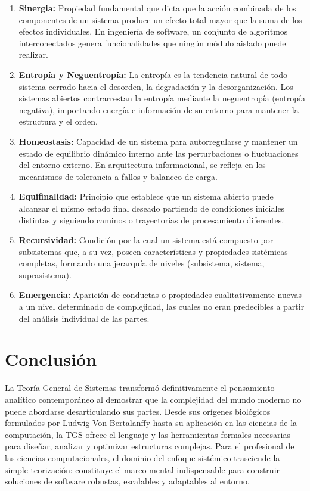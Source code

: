 \documentclass[12pt,letterpaper]{article}
\begin{document}
\begin{enumerate}[leftmargin=1.27cm, label=\roman*.]
    \item \textbf{Sinergia:} Propiedad fundamental que dicta que la acción combinada de los componentes de un sistema produce un efecto total mayor que la suma de los efectos individuales. En ingeniería de software, un conjunto de algoritmos interconectados genera funcionalidades que ningún módulo aislado puede realizar.
    
    \item \textbf{Entropía y Neguentropía:} La entropía es la tendencia natural de todo sistema cerrado hacia el desorden, la degradación y la desorganización. Los sistemas abiertos contrarrestan la entropía mediante la neguentropía (entropía negativa), importando energía e información de su entorno para mantener la estructura y el orden.
    
    \item \textbf{Homeostasis:} Capacidad de un sistema para autorregularse y mantener un estado de equilibrio dinámico interno ante las perturbaciones o fluctuaciones del entorno externo. En arquitectura informacional, se refleja en los mecanismos de tolerancia a fallos y balanceo de carga.
    
    \item \textbf{Equifinalidad:} Principio que establece que un sistema abierto puede alcanzar el mismo estado final deseado partiendo de condiciones iniciales distintas y siguiendo caminos o trayectorias de procesamiento diferentes.
    
    \item \textbf{Recursividad:} Condición por la cual un sistema está compuesto por subsistemas que, a su vez, poseen características y propiedades sistémicas completas, formando una jerarquía de niveles (subsistema, sistema, suprasistema).
    
    \item \textbf{Emergencia:} Aparición de conductas o propiedades cualitativamente nuevas a un nivel determinado de complejidad, las cuales no eran predecibles a partir del análisis individual de las partes.
\end{enumerate}

\centering \section*{Conclusión}

\begin{flushleft}
	

La Teoría General de Sistemas transformó definitivamente el pensamiento analítico contemporáneo al demostrar que la complejidad del mundo moderno no puede abordarse desarticulando sus partes. Desde sus orígenes biológicos formulados por Ludwig Von Bertalanffy hasta su aplicación en las ciencias de la computación, la TGS ofrece el lenguaje y las herramientas formales necesarias para diseñar, analizar y optimizar estructuras complejas. Para el profesional de las ciencias computacionales, el dominio del enfoque sistémico trasciende la simple teorización: constituye el marco mental indispensable para construir soluciones de software robustas, escalables y adaptables al entorno.
\end{flushleft}
\end{document}
